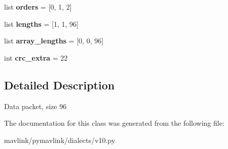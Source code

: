 \begin{DoxyCompactItemize}
\mbox{\label{classpymavlink_1_1dialects_1_1v10_1_1MAVLink__data96__message_aae5423f1d783eaba5652b006b045ee96}} 
list {\bfseries orders} = \mbox{[}0, 1, 2\mbox{]}
\item 
\mbox{\label{classpymavlink_1_1dialects_1_1v10_1_1MAVLink__data96__message_a34fc9fd15022d0a7a2aca26b6234be93}} 
list {\bfseries lengths} = \mbox{[}1, 1, 96\mbox{]}
\item 
\mbox{\label{classpymavlink_1_1dialects_1_1v10_1_1MAVLink__data96__message_aaa39d748699e9ca3becf174252b5c908}} 
list {\bfseries array\+\_\+lengths} = \mbox{[}0, 0, 96\mbox{]}
\item 
\mbox{\label{classpymavlink_1_1dialects_1_1v10_1_1MAVLink__data96__message_a5268e4eb88a1edc786a328dc63e310b6}} 
int {\bfseries crc\+\_\+extra} = 22
\end{DoxyCompactItemize}


\subsection{Detailed Description}
\begin{DoxyVerb}Data packet, size 96
\end{DoxyVerb}
 

The documentation for this class was generated from the following file\+:\begin{DoxyCompactItemize}
\item 
mavlink/pymavlink/dialects/v10.\+py\end{DoxyCompactItemize}
